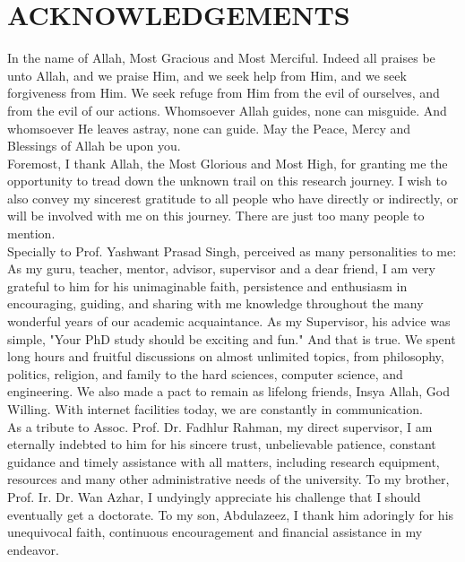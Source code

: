 \chapter{ACKNOWLEDGEMENTS}

\begin{singlespace}

\noindent


\noindent	
In the name of Allah, Most Gracious and Most Merciful. Indeed all praises be unto Allah, and we praise Him, and we seek help from Him, and we seek forgiveness from Him. We seek refuge from Him from the evil of ourselves, and from the evil of our actions. Whomsoever Allah guides, none can misguide. And whomsoever He leaves astray, none can guide. May the Peace, Mercy and Blessings of Allah be upon you.\\  

\noindent
Foremost, I thank Allah, the Most Glorious and Most High, for granting me the opportunity to tread down the unknown trail on this research journey. I wish to also convey my sincerest gratitude to all people who have directly or indirectly, or will be involved with me on this journey. There are just too many people to mention.   \\

\noindent
Specially to Prof. Yashwant Prasad Singh, perceived as many personalities to me: As my guru, teacher, mentor, advisor, supervisor and a dear friend, I am very grateful to him for his unimaginable faith, persistence and enthusiasm in encouraging, guiding, and sharing with me knowledge throughout the many wonderful years of our academic acquaintance. As my Supervisor, his advice was simple, "Your PhD study should be exciting and fun." And that is true. We spent long hours and fruitful discussions on almost unlimited topics, from philosophy, politics, religion, and family to the hard sciences, computer science, and engineering. We also made a pact to remain as lifelong friends, Insya Allah, God Willing. With internet facilities today, we are constantly in communication.\\

\noindent
As a tribute to Assoc. Prof. Dr. Fadhlur Rahman, my direct supervisor, I am eternally indebted to him for his sincere trust, unbelievable patience, constant guidance and timely assistance with all matters, including research equipment, resources and many other administrative needs of the university. To my brother, Prof. Ir. Dr. Wan Azhar, I undyingly appreciate his challenge that I should eventually get a doctorate. To my son, Abdulazeez, I thank him adoringly for his unequivocal faith, continuous encouragement and financial assistance in my endeavor.\\


\end{singlespace}
